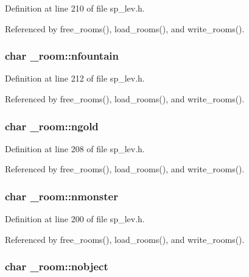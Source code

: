 Definition at line 210 of file sp\+\_\+lev.\+h.



Referenced by free\+\_\+rooms(), load\+\_\+rooms(), and write\+\_\+rooms().

\hypertarget{struct__room_a1dd82879b9d6ec47eee892f2b1f02f28}{
\subsubsection[{nfountain}]{\setlength{\rightskip}{0pt plus 5cm}char \+\_\+room\+::nfountain}}\label{struct__room_a1dd82879b9d6ec47eee892f2b1f02f28}


Definition at line 212 of file sp\+\_\+lev.\+h.



Referenced by free\+\_\+rooms(), load\+\_\+rooms(), and write\+\_\+rooms().

\hypertarget{struct__room_af05297b65bbb8d9ac4234faf6cedef40}{
\subsubsection[{ngold}]{\setlength{\rightskip}{0pt plus 5cm}char \+\_\+room\+::ngold}}\label{struct__room_af05297b65bbb8d9ac4234faf6cedef40}


Definition at line 208 of file sp\+\_\+lev.\+h.



Referenced by free\+\_\+rooms(), load\+\_\+rooms(), and write\+\_\+rooms().

\hypertarget{struct__room_af54a6a7c092d32717c95edf356a23f88}{
\subsubsection[{nmonster}]{\setlength{\rightskip}{0pt plus 5cm}char \+\_\+room\+::nmonster}}\label{struct__room_af54a6a7c092d32717c95edf356a23f88}


Definition at line 200 of file sp\+\_\+lev.\+h.



Referenced by free\+\_\+rooms(), load\+\_\+rooms(), and write\+\_\+rooms().

\hypertarget{struct__room_aa955a62dbaafdf4638c3d2ce3d08c650}{
\subsubsection[{nobject}]{\setlength{\rightskip}{0pt plus 5cm}char \+\_\+room\+::nobject}}\label{struct__room_aa955a62dbaafdf4638c3d2ce3d08c650}


